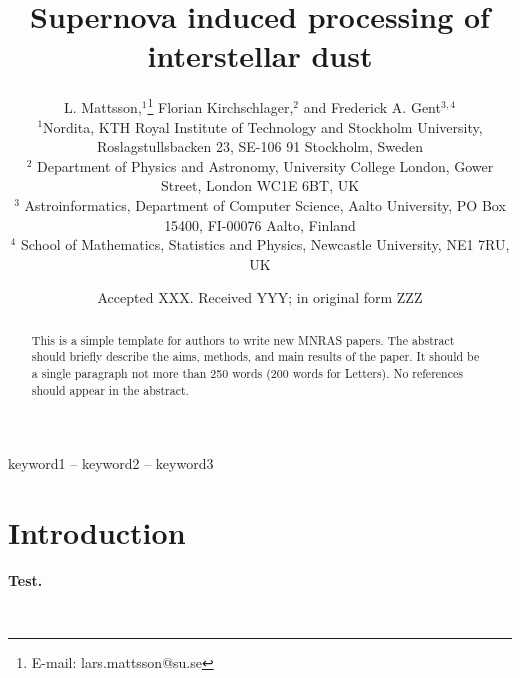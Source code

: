 \documentclass[fleqn,usenatbib]{mnras}
\title[Supernova induced processing of interstellar dust]{Supernova induced processing of interstellar dust}
\author[L. Mattsson et al.]{
L. Mattsson,$^{1}$\thanks{E-mail: lars.mattsson@su.se}
Florian Kirchschlager,$^{2}$ and
Frederick A. Gent$^{3,4}$
\\
$^{1}$Nordita, KTH Royal Institute of Technology and Stockholm University, Roslagstullsbacken 23, SE-106 91 Stockholm, Sweden\\
$^{2}$
Department
of Physics and Astronomy, University College London, Gower Street, London WC1E 6BT, UK\\
$^{3}$
Astroinformatics, Department of Computer Science, Aalto University, PO Box 15400, FI-00076 Aalto, Finland\\
$^{4}$
    School of Mathematics, Statistics and Physics,
      Newcastle University, NE1 7RU, UK 
}
\date{Accepted XXX. Received YYY; in original form ZZZ}
\newcommand{\fk}[1]{{\bf \textcolor{PineGreen}{#1}}}		%
\begin{document}
\label{firstpage}
\pagerange{\pageref{firstpage}--\pageref{lastpage}}
\maketitle

\begin{abstract}
This is a simple template for authors to write new MNRAS papers.
The abstract should briefly describe the aims, methods, and main results of the paper.
It should be a single paragraph not more than 250 words (200 words for Letters).
No references should appear in the abstract.
\end{abstract}

\begin{keywords}
keyword1 -- keyword2 -- keyword3
\end{keywords}



\section{Introduction}
\fk{Test.}

\newpage~
\newpage
 
\end{document}

